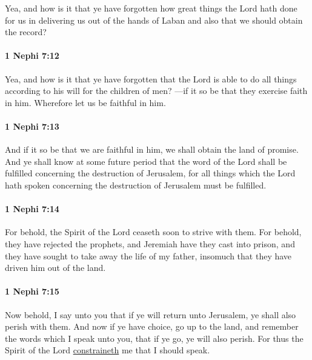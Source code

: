 			Yea, and how is it that ye have forgotten
			how great things the Lord hath done for us
			in delivering us out of the hands of Laban
			and also that we should obtain the record?

		\paragraph{1 Nephi 7:12} %
			\label{1NEPHI-7-12}

			Yea, and how is it that ye have forgotten
			that the Lord is able to do all things
			according to his will for the children of men?
			---if it so be that they exercise faith in him.
			Wherefore let us be faithful in him.

		\paragraph{1 Nephi 7:13} %
			\label{1NEPHI-7-13}

			And if it so be that we are faithful in him,
			we shall obtain the land of promise.
			And ye shall know at some future period
			that the word of the Lord shall be fulfilled
			concerning the destruction of Jerusalem,
			for all things which the Lord hath spoken
			concerning the destruction of Jerusalem must be fulfilled.

		\paragraph{1 Nephi 7:14} %
			\label{1NEPHI-7-14}

			For behold, the Spirit of the Lord ceaseth soon to strive with them.
			For behold, they have rejected the prophets,
			and Jeremiah have they cast into prison,
			and they have sought to take away the life of my father,
			insomuch that they have driven him out of the land.

		\paragraph{1 Nephi 7:15} %
			\label{1NEPHI-7-15}

			Now behold, I say unto you
			that if ye will return unto Jerusalem, ye shall also perish with them.
			And now if ye have choice, go up to the land,
			and remember the words which I speak unto you,
			that if ye go, ye will also perish.
			For thus the Spirit of the Lord \hyperref[CONSTRAIN]{constraineth} me that I should speak.

